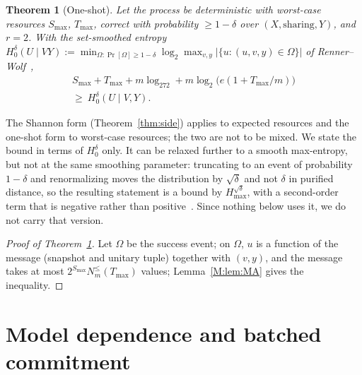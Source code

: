 \documentclass[aps,prx,twocolumn,superscriptaddress,nofootinbib,longbibliography]{revtex4-2}
\theoremstyle{plain}
\newtheorem{theorem}{Theorem}
\theoremstyle{definition}
\theoremstyle{remark}
\begin{document}
\begin{theorem}[One-shot]\label{thm:oneshot}
Let the process be deterministic with worst-case resources $S_{\max}$, $T_{\max}$, correct with probability $\ge1-\delta$ over $(X,\text{sharing},Y)$, and $r=2$. With the set-smoothed entropy $H_0^\delta(U\mid VY):=\min_{\Omega:\Pr[\Omega]\ge1-\delta}\log_2\max_{v,y}|\{u:(u,v,y)\in\Omega\}|$ of Renner--Wolf~\cite{RennerWolf},
\begin{multline}
S_{\max}+T_{\max}+m\log_272+m\log_2\!\big(e(1+T_{\max}/m)\big)\\
\ge\ H_0^\delta(U\mid V,Y).
\end{multline}
\end{theorem}
The Shannon form (Theorem~\ref{thm:side}) applies to expected resources and the one-shot form to worst-case resources; the two are not to be mixed. We state the bound in terms of $H_0^\delta$ only. It can be relaxed further to a smooth max-entropy, but not at the same smoothing parameter: truncating to an event of probability $1-\delta$ and renormalizing moves the distribution by $\sqrt\delta$ and not $\delta$ in purified distance, so the resulting statement is a bound by $H^{\sqrt\delta}_{\max}$, with a second-order term that is negative rather than positive~\cite{TomamichelHayashi}. Since nothing below uses it, we do not carry that version.

\begin{proof}[Proof of Theorem~\ref{thm:oneshot}]
Let $\Omega$ be the success event; on $\Omega$, $u$ is a function of the message (snapshot and unitary tuple) together with $(v,y)$, and the message takes at most $2^{S_{\max}}N^{\le}_m(T_{\max})$ values; Lemma~\ref{M:lem:MA} gives the inequality.
\end{proof}

\section{Model dependence and batched commitment}\label{sec:modelsupp}
\end{document}
